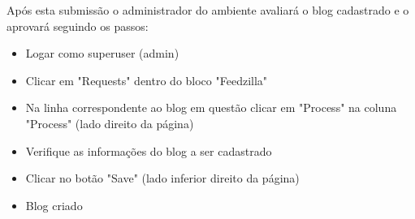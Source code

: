 Após esta submissão o administrador do ambiente avaliará o blog cadastrado
e o aprovará seguindo os passos:

\begin{itemize}
\item Logar como superuser (admin)
\item Clicar em "Requests" dentro do bloco "Feedzilla"
\item Na linha correspondente ao blog em questão clicar em "Process" na coluna 
"Process" (lado direito da página)
\item Verifique as informações do blog a ser cadastrado
\item Clicar no botão "Save" (lado inferior direito da página)
\item Blog criado
\end{itemize}



 




